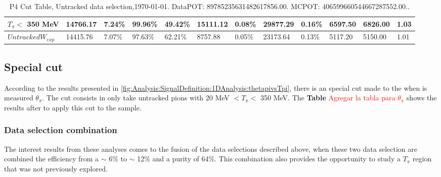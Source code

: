 \begin{table}[!hbt]
\begin{tabular}{|*{12}{l|}}
 $T_\pi<$ 350 MeV   & 14766.17     &   7.24\% &  99.96\% &  49.42\% & 15111.12 &   0.08\% & 29877.29     &   0.16\% & 6597.50     & 6826.00 &   1.03 \\ \hline
 $Untracked W_{exp}$   & 14415.76     &   7.07\% &  97.63\% &  62.21\% & 8757.88 &   0.05\% & 23173.64     &   0.13\% & 5117.20     & 5150.00 &   1.01 \\ \hline
    \end{tabular}
    \caption{P4 Cut Table, Untracked data selection,\today. DataPOT: 89785235631482617856.00. MCPOT: 406599660544667287552.00..}
    \label{tab:Analysis:Cuts:UntrackedCutTable}
\end{table}

\subsection{Special cut}
\label{Cap:Analysis:DataSelection:Cuts:SpecialCut}
According to the results presented in \ref{fig:Analysis:SignalDefinition:1DAnalysis:thetapivsTpi}, there is an special cut made to the when is measured $\theta_\pi$. The cut consists in only take untracked pions with 20 MeV $< T_\pi < $ 350 MeV. The \textbf{Table} \textcolor{red}{Agregar la tabla para $\theta_\pi$} shows the results after to apply this cut to the sample.


\pagebreak

\subsubsection{Data selection combination}

The interest results from these analyses comes to the fusion of the data selections described above, when these two data selection are combined the efficiency from a \(\sim\) 6\% to \(\sim\) 12\% and a purity of 64\%. This combination also provides the opportunity to study a $T_\pi$ region that was not previously explored. 

